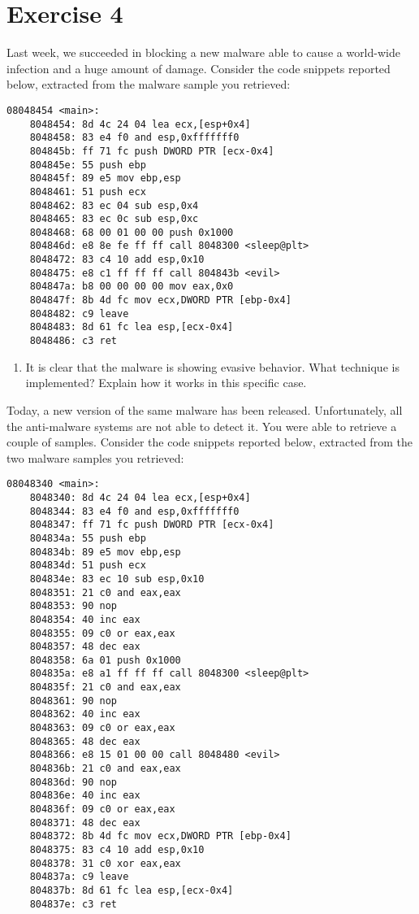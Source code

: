 \section{Exercise 4}

Last week, we succeeded in blocking a new malware able to cause a world-wide infection and a huge amount of damage.
Consider the code snippets reported below, extracted from the malware sample you retrieved:
\begin{verbatim}
08048454 <main>:
    8048454: 8d 4c 24 04 lea ecx,[esp+0x4]
    8048458: 83 e4 f0 and esp,0xfffffff0
    804845b: ff 71 fc push DWORD PTR [ecx-0x4]
    804845e: 55 push ebp
    804845f: 89 e5 mov ebp,esp
    8048461: 51 push ecx
    8048462: 83 ec 04 sub esp,0x4
    8048465: 83 ec 0c sub esp,0xc
    8048468: 68 00 01 00 00 push 0x1000
    804846d: e8 8e fe ff ff call 8048300 <sleep@plt>
    8048472: 83 c4 10 add esp,0x10
    8048475: e8 c1 ff ff ff call 804843b <evil>
    804847a: b8 00 00 00 00 mov eax,0x0
    804847f: 8b 4d fc mov ecx,DWORD PTR [ebp-0x4]
    8048482: c9 leave
    8048483: 8d 61 fc lea esp,[ecx-0x4]
    8048486: c3 ret 
\end{verbatim}
\begin{enumerate}
    \item It is clear that the malware is showing evasive behavior.
        What technique is implemented? 
        Explain how it works in this specific case. 
\end{enumerate}
Today, a new version of the same malware has been released.
Unfortunately, all the anti-malware systems are not able to detect it.
You were able to retrieve a couple of samples. 
Consider the code snippets reported below, extracted from the two malware samples you retrieved:
\begin{verbatim}
08048340 <main>:
    8048340: 8d 4c 24 04 lea ecx,[esp+0x4]
    8048344: 83 e4 f0 and esp,0xfffffff0
    8048347: ff 71 fc push DWORD PTR [ecx-0x4]
    804834a: 55 push ebp
    804834b: 89 e5 mov ebp,esp
    804834d: 51 push ecx
    804834e: 83 ec 10 sub esp,0x10
    8048351: 21 c0 and eax,eax
    8048353: 90 nop
    8048354: 40 inc eax
    8048355: 09 c0 or eax,eax
    8048357: 48 dec eax
    8048358: 6a 01 push 0x1000
    804835a: e8 a1 ff ff ff call 8048300 <sleep@plt>
    804835f: 21 c0 and eax,eax
    8048361: 90 nop
    8048362: 40 inc eax
    8048363: 09 c0 or eax,eax
    8048365: 48 dec eax
    8048366: e8 15 01 00 00 call 8048480 <evil>
    804836b: 21 c0 and eax,eax
    804836d: 90 nop
    804836e: 40 inc eax
    804836f: 09 c0 or eax,eax
    8048371: 48 dec eax
    8048372: 8b 4d fc mov ecx,DWORD PTR [ebp-0x4]
    8048375: 83 c4 10 add esp,0x10
    8048378: 31 c0 xor eax,eax
    804837a: c9 leave
    804837b: 8d 61 fc lea esp,[ecx-0x4]
    804837e: c3 ret
\end{verbatim}

